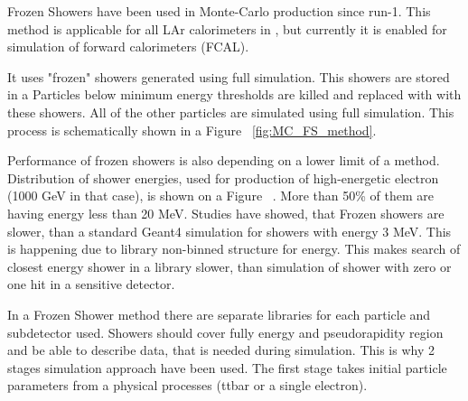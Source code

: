 Frozen Showers have been used in \atlas Monte-Carlo production since run-1. This method is applicable for all LAr calorimeters in \atlas, but currently it is enabled for simulation of forward calorimeters (FCAL). 
 
It uses "frozen" showers generated using full simulation.  This showers are stored in a  Particles below minimum energy
thresholds are killed and replaced with with these showers. All of the other particles are simulated using full simulation. This process is schematically shown in a Figure ~\ref{fig:MC_FS_method}.


\begin{figure}[!b]
\end{figure}



\begin{figure}[!tbp]
\end{figure}

Performance of frozen showers is also depending on a lower limit of a method. 
Distribution of shower energies, used for production of high-energetic electron (1000 GeV in that case), is shown on a Figure ~. More than 50\% of them are having energy less than 20 MeV. Studies have showed, that Frozen showers are slower, than a standard Geant4 simulation for showers with energy 3 MeV. This is happening due to library non-binned structure for energy. This makes search of closest energy shower in a library slower, than simulation of shower with zero or one hit in a sensitive detector. 



In a Frozen Shower method there are separate libraries for each particle and subdetector used. Showers should cover fully energy and pseudorapidity region and be able to describe data, that is needed during simulation. This is why 2 stages simulation approach have been used. The first stage takes initial particle parameters from a physical processes (ttbar or a single electron). 

